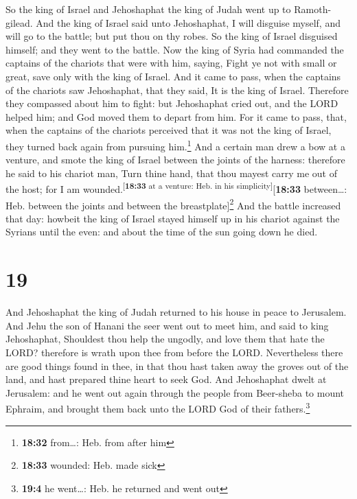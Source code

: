  So the king of Israel and Jehoshaphat the king of Judah
went up to Ramoth-gilead.  And the king of Israel said
unto Jehoshaphat, I will disguise myself, and will go to the battle; but
put thou on thy robes. So the king of Israel disguised himself; and they
went to the battle.  Now the king of Syria had commanded
the captains of the chariots that were with him, saying, Fight ye not
with small or great, save only with the king of Israel. 
And it came to pass, when the captains of the chariots saw Jehoshaphat,
that they said, It is the king of Israel. Therefore they compassed about
him to fight: but Jehoshaphat cried out, and the LORD helped him; and
God moved them to depart from him.  For it came to pass,
that, when the captains of the chariots perceived that it was not the
king of Israel, they turned back again from pursuing him.\footnote{\textbf{18:32}
  from\ldots: Heb. from after him}  And a certain man
drew a bow at a venture, and smote the king of Israel between the joints
of the harness: therefore he said to his chariot man, Turn thine hand,
that thou mayest carry me out of the host; for I am
wounded.\textsuperscript{{[}\textbf{18:33} at a venture: Heb. in his
simplicity{]}}{[}\textbf{18:33} between\ldots: Heb. between the joints
and between the breastplate{]}\footnote{\textbf{18:33} wounded: Heb.
  made sick}  And the battle increased that day: howbeit
the king of Israel stayed himself up in his chariot against the Syrians
until the even: and about the time of the sun going down he died.

\hypertarget{section-18}{%
\section{19}\label{section-18}}

 And Jehoshaphat the king of Judah returned to his house
in peace to Jerusalem.  And Jehu the son of Hanani the
seer went out to meet him, and said to king Jehoshaphat, Shouldest thou
help the ungodly, and love them that hate the LORD? therefore is wrath
upon thee from before the LORD.  Nevertheless there are
good things found in thee, in that thou hast taken away the groves out
of the land, and hast prepared thine heart to seek God. 
And Jehoshaphat dwelt at Jerusalem: and he went out again through the
people from Beer-sheba to mount Ephraim, and brought them back unto the
LORD God of their fathers.\footnote{\textbf{19:4} he went\ldots: Heb. he
  returned and went out}

